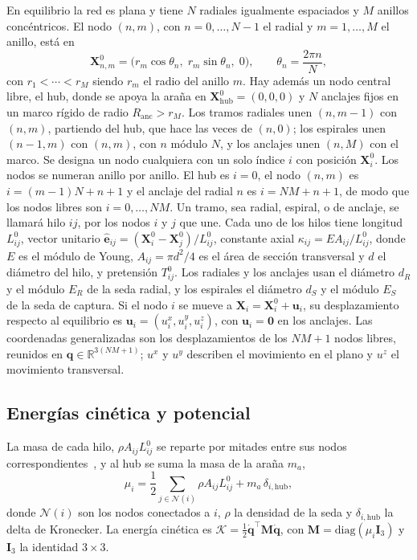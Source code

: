 \documentclass[fleqn,final]{jaes}
\begin{document}
En equilibrio la red es plana y tiene $N$ radiales igualmente
espaciados y $M$ anillos concéntricos. El nodo $(n,m)$, con $n=0,\dots,N-1$ el radial y $m=1,\dots,M$
el anillo, está en
\begin{equation}
  \mathbf{X}^0_{n,m}=\bigl(r_m\cos\theta_n,\;r_m\sin\theta_n,\;0\bigr),
  \qquad \theta_n=\frac{2\pi n}{N},
  \label{eq:equilibrio_pos}
\end{equation}
con $r_1<\cdots<r_M$ siendo $r_m$ el radio del anillo $m$. Hay además un nodo central libre, el hub, donde se apoya la araña en $\mathbf{X}^0_{\mathrm{hub}} = (0,0,0)$ y $N$ anclajes fijos en un marco rígido de radio $R_{\mathrm{anc}}>r_M$. Los tramos radiales unen $(n,m-1)$ con $(n,m)$, partiendo del hub, que hace las veces de $(n,0)$; los espirales unen $(n-1,m)$ con $(n,m)$, con $n$ módulo $N$, y los anclajes unen $(n,M)$ con el marco. Se designa un nodo cualquiera con un solo índice $i$ con posición $\mathbf{X}^0_i$. Los nodos se numeran anillo por anillo. El hub es $i=0$, el nodo $(n,m)$
es $i=(m-1)N+n+1$ y el anclaje del radial $n$ es $i=NM+n+1$, de modo que
los nodos libres son $i=0,\dots,NM$. Un tramo, sea radial, espiral, o de anclaje, se llamará hilo $ij$, por los nodos $i$ y $j$ que une. Cada uno de los hilos tiene longitud $L^0_{ij}$, vector unitario $\hat{\mathbf{e}}_{ij}=(\mathbf{X}^0_i-\mathbf{X}^0_j)/L^0_{ij}$, constante axial $\kappa_{ij}=EA_{ij}/L^0_{ij}$, donde $E$ es el módulo de Young, $A_{ij}=\pi d^2/4$ es el área de sección transversal y $d$ el diámetro del hilo, y pretensión $T^0_{ij}$. Los radiales y los anclajes usan el diámetro $d_R$ y el módulo $E_R$ de la seda radial, y los espirales el diámetro $d_S$ y el módulo $E_S$ de la seda de captura. Si el nodo $i$ se mueve a $\mathbf{X}_i=\mathbf{X}^0_i+\mathbf{u}_i$, su
desplazamiento respecto al equilibrio es $\mathbf{u}_i=(u^x_i,u^y_i,u^z_i)$,
con $\mathbf{u}_i=\mathbf{0}$ en los anclajes. Las coordenadas
generalizadas son los desplazamientos de los $NM+1$ nodos libres, reunidos en $\mathbf{q}\in\mathbb{R}^{3(NM+1)}$; $u^x$ y $u^y$ describen el movimiento en el plano y $u^z$ el movimiento transversal.

\subsection{Energías cinética y potencial}

La masa de cada hilo, $\rho A_{ij}L^0_{ij}$ se reparte por mitades entre sus nodos correspondientes~\cite{meirovitch2001}, y al hub se suma la masa de la araña $m_a$,
\begin{equation}
  \mu_i=\frac12\sum_{j\in\mathcal{N}(i)}\rho A_{ij}L^0_{ij}
  +m_a\,\delta_{i,\mathrm{hub}},
  \label{eq:masas}
\end{equation}
donde $\mathcal{N}(i)$ son los nodos conectados a $i$, $\rho$ la densidad
de la seda y $\delta_{i,\mathrm{hub}}$ la delta de Kronecker. La energía
cinética es
$\mathcal{K}=\frac12\dot{\mathbf{q}}^{\top}\mathbf{M}\dot{\mathbf{q}}$, con
$\mathbf{M}=\mathrm{diag}(\mu_i\mathbf{I}_3)$ y $\mathbf{I}_3$ la
identidad $3\times3$.
\end{document}
